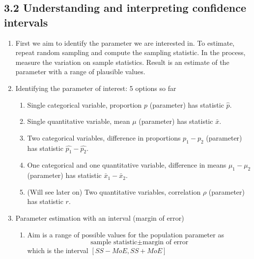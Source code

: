 \documentclass{article}
\begin{document}
\subsection{3.2 Understanding and interpreting confidence intervals}
\begin{enumerate}

\item First we aim to identify the parameter we are interested in. To estimate, repeat random sampling and compute the sampling statistic. In the process, measure the variation on sample statistics. Result is an estimate of the parameter with a range of plausible values.

\item Identifying the parameter of interest: 5 options so far
\begin{enumerate}
\item Single categorical variable, proportion $p$ (parameter) has statistic $\hat{p}$.
\item Single quantitative variable, mean $\mu$ (parameter) has statistic $\bar{x}$.
\item Two categorical variables, difference in proportions $p_1-p_2$ (parameter) has statistic $\hat{p_1}-\hat{p_2}$.
\item One categorical and one quantitative variable, difference in means $\mu_1-\mu_2$ (parameter) has statistic $\bar{x}_1-\bar{x}_2$.
\item (Will see later on) Two quantitative variables, correlation $\rho$ (parameter) has statistic $r$.
\end{enumerate}

\item Parameter estimation with an interval (margin of error)
\begin{enumerate}
\item Aim is a range of possible values for the population parameter as
\[
\text{sample statistic} \pm \text{margin of error}
\]
which is the interval $[SS - MoE, SS + MoE]$
\end{enumerate}


\end{enumerate}
\end{document}
